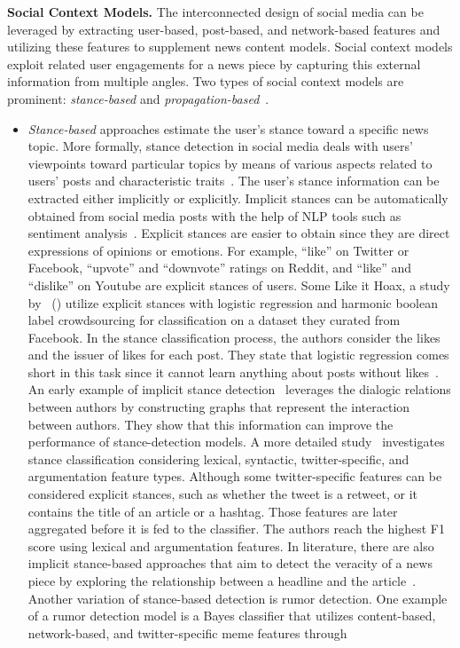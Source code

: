\textbf{Social Context Models.} The interconnected design of social media can be leveraged by extracting user-based, post-based, and network-based features and utilizing these features to supplement news content models. Social context models exploit related user engagements for a news piece by capturing this external information from multiple angles. Two types of social context models are prominent: \emph{stance-based} and \emph{propagation-based}~\parencite{FakeNewsDetectionOnSocialMediaADataMiningPerspective_Shu}.
\begin{itemize}
    \item \emph{Stance-based} approaches estimate the user’s stance toward a specific news topic. More formally, stance detection in social media deals with users’ viewpoints toward particular topics by means of various aspects related to users’ posts and characteristic traits~\parencite{StanceDetectionOnSocialMeda_Abeer}. The user’s stance information can be extracted either implicitly or explicitly. Implicit stances can be automatically obtained from social media posts with the help of NLP tools such as sentiment analysis~\parencite{StanceAndSentimentINTweets_Saif}. Explicit stances are easier to obtain since they are direct expressions of opinions or emotions. For example, “like” on Twitter or Facebook, “upvote” and “downvote” ratings on Reddit, and “like” and “dislike” on Youtube are explicit stances of users. Some Like it Hoax, a study by~\citeauthor{SomeLikeItHoaxDataset_Tacchini} (\citeyear{SomeLikeItHoaxDataset_Tacchini}) utilize explicit stances with logistic regression and harmonic boolean label crowdsourcing for classification on a dataset they curated from Facebook. In the stance classification process, the authors consider the likes and the issuer of likes for each post. They state that logistic regression comes short in this task since it cannot learn anything about posts without likes~\parencite{SomeLikeItHoaxDataset_Tacchini}. An early example of implicit stance detection~\parencite{StanceClassificationDialogicProps_Walker} leverages the dialogic relations between authors by constructing graphs that represent the interaction between authors. They show that this information can improve the performance of stance-detection models. A more detailed study~\parencite{StanceClassificationOnTwitterDebates_Addawood} investigates stance classification considering lexical, syntactic, twitter-specific, and argumentation feature types. Although some twitter-specific features can be considered explicit stances, such as whether the tweet is a retweet, or it contains the title of an article or a hashtag. Those features are later aggregated before it is fed to the classifier. The authors reach the highest F1 score using lexical and argumentation features. In literature, there are also implicit stance-based approaches that aim to detect the veracity of a news piece by exploring the relationship between a headline and the article~\parencite{ARetrospectiveAnalysisOfFNC_Hanselowski, StanceDetectionInFakeNews_Ghanem}.\\Another variation of stance-based detection is rumor detection. One example of a rumor detection model is a Bayes classifier that utilizes content-based, network-based, and twitter-specific meme features through 
\end{itemize}
